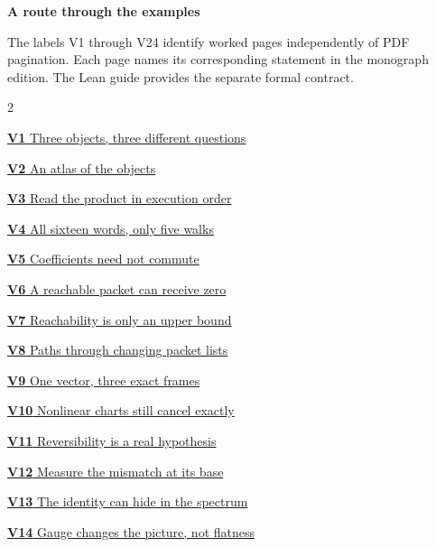\documentclass[11pt,letterpaper]{article}
\begin{document}
\KomorebiCover
{}
{\sffamily\bfseries\Large\color{accent}A route through the examples}\par\medskip
The labels V1 through V24 identify worked pages independently of PDF
pagination. Each page names its corresponding statement in the monograph edition. The Lean guide provides the separate formal contract.
\medskip
\begin{multicols}{2}
{\small\noindent\hyperlink{vpage1}{\textbf{V1} Three objects, three different questions}\par\smallskip}
{\small\noindent\hyperlink{vpage2}{\textbf{V2} An atlas of the objects}\par\smallskip}
{\small\noindent\hyperlink{vpage3}{\textbf{V3} Read the product in execution order}\par\smallskip}
{\small\noindent\hyperlink{vpage4}{\textbf{V4} All sixteen words, only five walks}\par\smallskip}
{\small\noindent\hyperlink{vpage5}{\textbf{V5} Coefficients need not commute}\par\smallskip}
{\small\noindent\hyperlink{vpage6}{\textbf{V6} A reachable packet can receive zero}\par\smallskip}
{\small\noindent\hyperlink{vpage7}{\textbf{V7} Reachability is only an upper bound}\par\smallskip}
{\small\noindent\hyperlink{vpage8}{\textbf{V8} Paths through changing packet lists}\par\smallskip}
{\small\noindent\hyperlink{vpage9}{\textbf{V9} One vector, three exact frames}\par\smallskip}
{\small\noindent\hyperlink{vpage10}{\textbf{V10} Nonlinear charts still cancel exactly}\par\smallskip}
{\small\noindent\hyperlink{vpage11}{\textbf{V11} Reversibility is a real hypothesis}\par\smallskip}
{\small\noindent\hyperlink{vpage12}{\textbf{V12} Measure the mismatch at its base}\par\smallskip}
{\small\noindent\hyperlink{vpage13}{\textbf{V13} The identity can hide in the spectrum}\par\smallskip}
{\small\noindent\hyperlink{vpage14}{\textbf{V14} Gauge changes the picture, not flatness}\par\smallskip}

\end{multicols}
\end{document}
